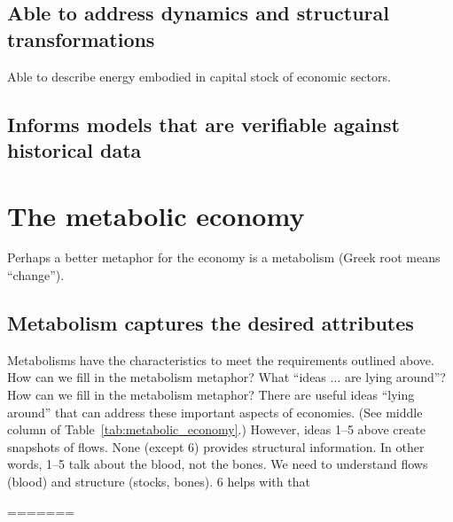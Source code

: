 \subsection{Able to address dynamics and structural transformations}
\label{sec:structure}

Able to describe energy embodied in capital stock of economic sectors.

\subsection{Informs models that are verifiable against historical data}
\label{sec:verifiable}

\section{The metabolic economy}
\label{sec:metabolic_economy}

Perhaps a better metaphor for the economy is a metabolism (Greek root means ``change''). 

\subsection{Metabolism captures the desired attributes}
\label{sec:metabolism_works}
     
Metabolisms have the characteristics to meet the requirements outlined above.
How can we fill in the metabolism metaphor? What ``ideas ... are lying around''?
How can we fill in the metabolism metaphor? 
There are useful ideas ``lying around'' that can address these important aspects of economies. 
(See middle column of Table~\ref{tab:metabolic_economy}.) 
However, ideas 1–5 above create snapshots of flows. 
None (except 6) provides structural information. 
In other words, 1–5 talk about the blood, not the bones. 
We need to understand flows (blood) and structure (stocks, bones). 
6 helps with that

=======

